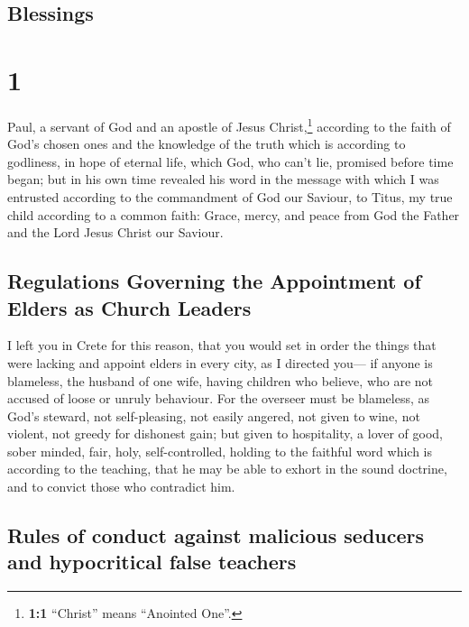 \hypertarget{blessings}{%
\subsection{Blessings}\label{blessings}}

\hypertarget{section}{%
\section{1}\label{section}}

 Paul, a servant of God and an apostle of Jesus
Christ,\footnote{\textbf{1:1} ``Christ'' means ``Anointed One''.}
according to the faith of God's chosen ones and the knowledge of the
truth which is according to godliness,  in hope of eternal
life, which God, who can't lie, promised before time began;
 but in his own time revealed his word in the message with
which I was entrusted according to the commandment of God our Saviour,
 to Titus, my true child according to a common faith:
Grace, mercy, and peace from God the Father and the Lord Jesus Christ
our Saviour.

\hypertarget{regulations-governing-the-appointment-of-elders-as-church-leaders}{%
\subsection{Regulations Governing the Appointment of Elders as Church
Leaders}\label{regulations-governing-the-appointment-of-elders-as-church-leaders}}

 I left you in Crete for this reason, that you would set
in order the things that were lacking and appoint elders in every city,
as I directed you---  if anyone is blameless, the husband
of one wife, having children who believe, who are not accused of loose
or unruly behaviour.  For the overseer must be blameless,
as God's steward, not self-pleasing, not easily angered, not given to
wine, not violent, not greedy for dishonest gain;  but
given to hospitality, a lover of good, sober minded, fair, holy,
self-controlled,  holding to the faithful word which is
according to the teaching, that he may be able to exhort in the sound
doctrine, and to convict those who contradict him.

\hypertarget{rules-of-conduct-against-malicious-seducers-and-hypocritical-false-teachers}{%
\subsection{Rules of conduct against malicious seducers and hypocritical
false
teachers}\label{rules-of-conduct-against-malicious-seducers-and-hypocritical-false-teachers}}

